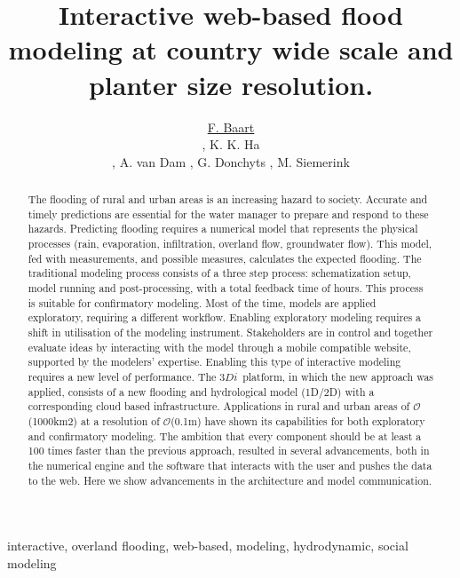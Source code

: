 \documentclass[a4paper]{article}
\title{Interactive web-based flood modeling at country wide scale and planter size resolution.}
\author{\underline{F. Baart}
  \address[A1]{\it{Deltares,
      Rotterdamseweg,
      Delft, The Netherlands (fedor.baart@deltares.nl, arthur.vandam@deltares.nl, gennadii.donchyts@deltares.nl)}},
  K. K. Ha
  \address[B1]{\it{Nelen \& Schuurmans,
      Zakkendragerssteeg,
      Utrecht, The Netherlands (jack.ha@nelen-schuurmans.nl, martijn.siemerink@nelen-schuurmans.nl)}},
  A. van Dam \addressmark[A1],
  G. Donchyts \addressmark[A1],
  M. Siemerink \addressmark[B1]
}
\DeclareRobustCommand{\orderof}{\ensuremath{\mathcal{O}}}
\DeclareRobustCommand{\threedi}{$3Di$~}
\begin{document}
\sffamily
\sansmath

\begin{abstract}
  The flooding of rural and urban areas is an increasing hazard to society. Accurate and timely predictions are essential for the water manager to prepare and respond to these hazards.
  Predicting flooding requires a numerical model that represents the physical processes (rain, evaporation, infiltration, overland flow, groundwater flow). This model, fed with measurements, and possible measures, calculates the expected flooding.
  The traditional modeling process consists of a three step process: schematization setup, model running and post-processing, with a total feedback time of hours.  This process is suitable for confirmatory modeling. Most of the time, models are applied exploratory, requiring a different workflow.
  Enabling exploratory modeling requires a shift in utilisation of the modeling instrument. Stakeholders are in control and together evaluate ideas by interacting with the model through a mobile compatible website, supported by the modelers’ expertise. Enabling this type of interactive modeling requires a new level of performance.
  The \threedi platform, in which the new approach was applied, consists of a new flooding and hydrological model (1D/2D) with a corresponding cloud based infrastructure. Applications in rural and urban areas of \orderof(1000km2) at a resolution of \orderof(0.1m) have shown its capabilities for both exploratory and confirmatory modeling.
  The ambition that every component should be at least a 100 times faster than the previous approach, resulted in several advancements, both in the numerical engine and the software that interacts with the user and pushes the data to the web. Here we show advancements in the architecture and model communication.

\end{abstract}
\begin{keyword}
interactive, overland flooding, web-based, modeling, hydrodynamic, social modeling
\end{keyword}

\maketitle
\end{document}
